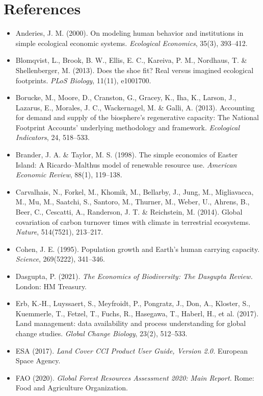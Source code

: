 \documentclass[11pt]{article}
\begin{document}
\section{References}

\begin{itemize}
\item Anderies, J. M. (2000). On modeling human behavior and institutions in simple ecological economic systems. \emph{Ecological Economics}, 35(3), 393--412.
\item Blomqvist, L., Brook, B. W., Ellis, E. C., Kareiva, P. M., Nordhaus, T. \& Shellenberger, M. (2013). Does the shoe fit? Real versus imagined ecological footprints. \emph{PLoS Biology}, 11(11), e1001700.
\item Borucke, M., Moore, D., Cranston, G., Gracey, K., Iha, K., Larson, J., Lazarus, E., Morales, J. C., Wackernagel, M. \& Galli, A. (2013). Accounting for demand and supply of the biosphere's regenerative capacity: The National Footprint Accounts' underlying methodology and framework. \emph{Ecological Indicators}, 24, 518--533.
\item Brander, J. A. \& Taylor, M. S. (1998). The simple economics of Easter Island: A Ricardo--Malthus model of renewable resource use. \emph{American Economic Review}, 88(1), 119--138.
\item Carvalhais, N., Forkel, M., Khomik, M., Bellarby, J., Jung, M., Migliavacca, M., Mu, M., Saatchi, S., Santoro, M., Thurner, M., Weber, U., Ahrens, B., Beer, C., Cescatti, A., Randerson, J. T. \& Reichstein, M. (2014). Global covariation of carbon turnover times with climate in terrestrial ecosystems. \emph{Nature}, 514(7521), 213--217.
\item Cohen, J. E. (1995). Population growth and Earth's human carrying capacity. \emph{Science}, 269(5222), 341--346.
\item Dasgupta, P. (2021). \emph{The Economics of Biodiversity: The Dasgupta Review.} London: HM Treasury.
\item Erb, K.-H., Luyssaert, S., Meyfroidt, P., Pongratz, J., Don, A., Kloster, S., Kuemmerle, T., Fetzel, T., Fuchs, R., Hasegawa, T., Haberl, H., et al. (2017). Land management: data availability and process understanding for global change studies. \emph{Global Change Biology}, 23(2), 512--533.
\item ESA (2017). \emph{Land Cover CCI Product User Guide, Version 2.0.} European Space Agency.
\item FAO (2020). \emph{Global Forest Resources Assessment 2020: Main Report.} Rome: Food and Agriculture Organization.

\end{itemize}
\end{document}
